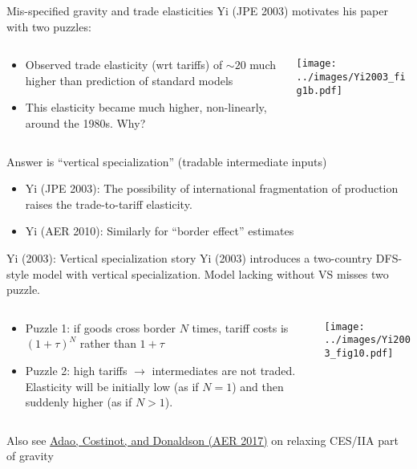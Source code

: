 \documentclass[10pt,notes=hide]{beamer}
\begin{document}
\begin{frame}{Mis-specified gravity and trade elasticities}
Yi (JPE 2003) motivates his paper with two puzzles:
\begin{columns}
\begin{column}{.49\textwidth}
\begin{itemize}
\item Observed trade elasticity (wrt tariffs) of $\sim 20$ much higher than prediction of standard models
\item This elasticity became much higher, non-linearly, around the 1980s. Why?
\end{itemize}
\end{column}
\begin{column}{.5\textwidth}
\texttt{[image: ../images/Yi2003\_fig1b.pdf]}
\end{column}
\end{columns}
\vspace{2mm}
Answer is ``vertical specialization'' (tradable intermediate inputs)
\begin{itemize}
	\item Yi (JPE 2003): The possibility of international fragmentation of production raises the trade-to-tariff elasticity.
	\item Yi (AER 2010): Similarly for ``border effect'' estimates
\end{itemize}
\end{frame}
\begin{frame}{Yi (2003): Vertical specialization story}
Yi (2003) introduces a two-country DFS-style model with vertical specialization. Model lacking without VS misses two puzzle.
\begin{columns}
\begin{column}{.45\textwidth}
\begin{itemize}
	\item Puzzle 1: if goods cross border $N$ times,
	tariff costs is $(1+\tau)^N$ rather than $1+\tau$
	\item Puzzle 2: high tariffs $\to$ intermediates are not traded.
	Elasticity will be initially low (as if $N = 1$) and then suddenly higher (as if $N > 1$).
\end{itemize}
\end{column}
\begin{column}{.53\textwidth}
\texttt{[image: ../images/Yi2003\_fig10.pdf]}
\end{column}
\end{columns}
\vspace{3mm}
Also see \href{https://www.aeaweb.org/articles?id=10.1257/aer.20150956}{Adao, Costinot, and Donaldson (AER 2017)} on relaxing CES/IIA part of gravity
\end{frame}
\end{document}
